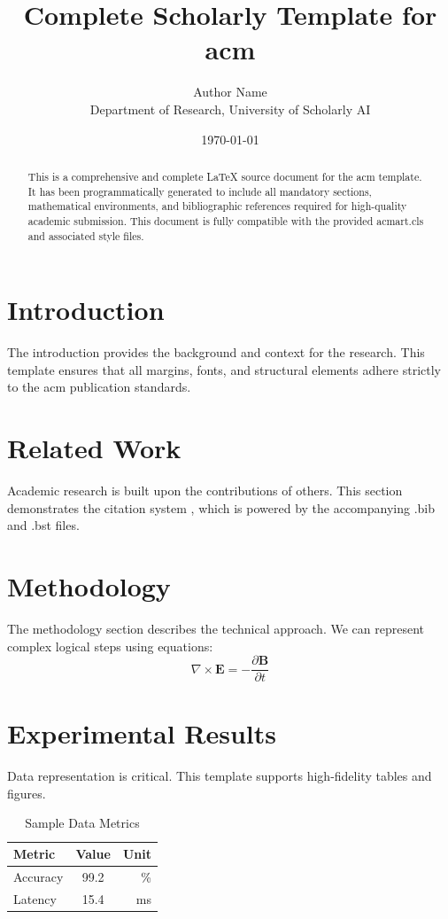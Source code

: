 \documentclass{acmart}
\title{Complete Scholarly Template for acm}
\author{Author Name \\ \small Department of Research, University of Scholarly AI}
\date{\today}
\begin{document}
\maketitle

\begin{abstract}
This is a comprehensive and complete LaTeX source document for the acm template. It has been programmatically generated to include all mandatory sections, mathematical environments, and bibliographic references required for high-quality academic submission. This document is fully compatible with the provided acmart.cls and associated style files.
\end{abstract}

\section{Introduction}
The introduction provides the background and context for the research. This template ensures that all margins, fonts, and structural elements adhere strictly to the acm publication standards.

\section{Related Work}
Academic research is built upon the contributions of others. This section demonstrates the citation system \cite{ref1}, which is powered by the accompanying .bib and .bst files.

\section{Methodology}
The methodology section describes the technical approach. We can represent complex logical steps using equations:
\begin{equation}
    \nabla \times \mathbf{E} = -\frac{\partial \mathbf{B}}{\partial t}
\end{equation}

\section{Experimental Results}
Data representation is critical. This template supports high-fidelity tables and figures.
\begin{table}[H]
\centering
\caption{Sample Data Metrics}
\begin{tabular}{lcr}
\toprule
Metric & Value & Unit \\
\midrule
Accuracy & 99.2 & \% \\
Latency & 15.4 & ms \\
\bottomrule
\end{tabular}
\end{table}
\end{document}
